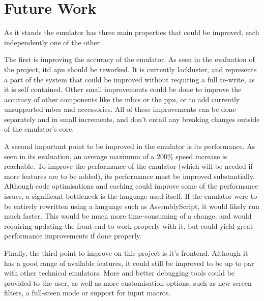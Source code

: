 \documentclass[11pt]{report}
\begin{document}
\section{Future Work}

As it stands the emulator has three main properties that could be improved, each independently one of the other.

The first is improving the accuracy of the emulator. As seen in the evaluation of the project, itd \gls{apu} should be reworked. It is currently lackluster, and represents a part of the system that could be improved without requiring a full re-write, as it is self contained. Other small improvements could be done to improve the accuracy of other components like the \glspl{mbc} or the \gls{ppu}, or to add currently unsupported \glspl{mbc} and accessories. All of these improvements can be done separately and in small increments, and don't entail any breaking changes outside of the emulator's core.

A second important point to be improved in the emulator is its performance. As seen in its evaluation, an average maximum of a 200\% speed increase is reachable. To improve the performance of the emulator (which will be needed if more features are to be added), its performance must be improved substantially. Although code optimisations and caching could improve some of the performance issues, a significant bottleneck is the language used itself. If the emulator were to be entirely rewritten using a language such as AssemblyScript, it would likely run much faster. This would be much more time-consuming of a change, and would requiring updating the front-end to work properly with it, but could yield great performance improvements if done properly.

Finally, the third point to improve on this project is it's frontend. Although it has a good range of available features, it could still be improved to be up to par with other technical emulators. More and better debugging tools could be provided to the user, as well as more customisation options, such as new screen filters, a full-sreen mode or support for input macros.

\clearpage

\printnoidxglossary[type=\acronymtype]

\printnoidxglossary[type=main]

\printbibliography
\end{document}
